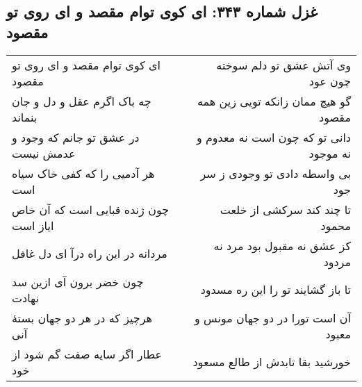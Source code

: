 \begin{center}
\section*{غزل شماره ۳۴۳: ای کوی توام مقصد و ای روی تو مقصود}
\label{sec:343}
\begin{longtable}{l p{0.5cm} r}
ای کوی توام مقصد و ای روی تو مقصود
&&
وی آتش عشق تو دلم سوخته چون عود
\\
چه باک اگرم عقل و دل و جان بنماند
&&
گو هیچ ممان زانکه تویی زین همه مقصود
\\
در عشق تو جانم که وجود و عدمش نیست
&&
دانی تو که چون است نه معدوم و نه موجود
\\
هر آدمیی را که کفی خاک سیاه است
&&
بی واسطه دادی تو وجودی ز سر جود
\\
چون ژنده قبایی است که آن خاص ایاز است
&&
تا چند کند سرکشی از خلعت محمود
\\
مردانه در این راه درآ ای دل غافل
&&
کز عشق نه مقبول بود مرد نه مردود
\\
چون خضر برون آی ازین سد نهادت
&&
تا باز گشایند تو را این ره مسدود
\\
هرچیز که در هر دو جهان بستهٔ آنی
&&
آن است تورا در دو جهان مونس و معبود
\\
عطار اگر سایه صفت گم شود از خود
&&
خورشید بقا تابدش از طالع مسعود
\\
\end{longtable}
\end{center}
